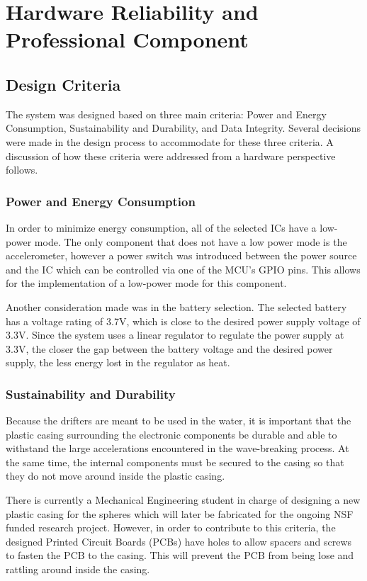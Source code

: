 \section{Hardware Reliability and Professional Component}

\subsection{Design Criteria}
The system was designed based on three main criteria: Power and Energy Consumption, Sustainability and Durability, and Data Integrity.  Several decisions were made in the design process to accommodate for these three criteria.  A discussion of how these criteria were addressed from a hardware perspective follows.

\subsubsection{Power and Energy Consumption}
In order to minimize energy consumption, all of the selected ICs have a low-power mode.  The only component that does not have a low power mode is the accelerometer, however a power switch was introduced between the power source and the IC which can be controlled via one of the MCU's GPIO pins.  This allows for the implementation of a low-power mode for this component.

Another consideration made was in the battery selection.  The selected battery has a voltage rating of 3.7V, which is close to the desired power supply voltage of 3.3V.  Since the system uses a linear regulator to regulate the power supply at 3.3V, the closer the gap between the battery voltage and the desired power supply, the less energy lost in the regulator as heat.

\subsubsection{Sustainability and Durability}
Because the drifters are meant to be used in the water, it is important that the plastic casing surrounding the electronic components be durable and able to withstand the large accelerations encountered in the wave-breaking process.  At the same time, the internal components must be secured to the casing so that they do not move around inside the plastic casing.

There is currently a Mechanical Engineering student in charge of designing a new plastic casing for the spheres which will later be fabricated for the ongoing NSF funded research project.  However, in order to contribute to this criteria, the designed Printed Circuit Boards (PCBs) have holes to allow spacers and screws to fasten the PCB to the casing.  This will prevent the PCB from being lose and rattling around inside the casing.

